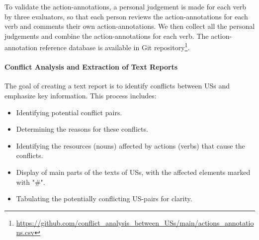 To validate the action-annotations, a personal judgement is made for each verb by three evaluators, so that each person reviews the action-annotations for each verb and comments their own action-annotations. We then collect all the personal judgements and combine the action-annotations for each verb. The action-annotation reference database is available in Git repository\footnote{\href{https://github.com/amirrabieyannejad/conflict_analysis_between_USs/blob/main/actions_annotations.csv}{https://github.com/conflict\_analysis\_between\_USs/main/actions\_annotations.csv}}.


\paragraph{Conflict Analysis and Extraction of Text Reports} The goal of creating a text report is to identify conflicts between USs and emphasize key information. This process includes:
\begin{itemize}
\item Identifying potential conflict pairs.

\item Determining the reasons for these conflicts.

\item Identifying the resources (nouns) affected by actions (verbs) that cause the conflicts.

\item Display of main parts of the texts of USs, with the affected elements marked with "\#".

\item Tabulating the potentially conflicting US-pairs for clarity.
\end{itemize}
